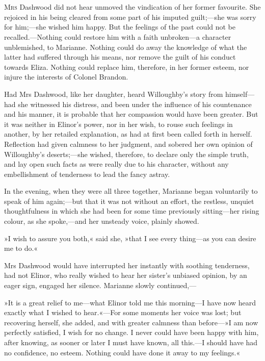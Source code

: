 \chapter[Chapter \thechapter]{}
\lettrine[lines=4,lraise=0.3]{M}{rs} Dashwood did not hear unmoved the vindication of her former favourite. She rejoiced in his being cleared from some part of his imputed guilt;—she was sorry for him;—she wished him happy. But the feelings of the past could not be recalled.—Nothing could restore him with a faith unbroken—a character unblemished, to Marianne. Nothing could do away the knowledge of what the latter had suffered through his means, nor remove the guilt of his conduct towards Eliza. Nothing could replace him, therefore, in her former esteem, nor injure the interests of Colonel Brandon.

Had Mrs Dashwood, like her daughter, heard Willoughby’s story from himself—had she witnessed his distress, and been under the influence of his countenance and his manner, it is probable that her compassion would have been greater. But it was neither in Elinor’s power, nor in her wish, to rouse such feelings in another, by her retailed explanation, as had at first been called forth in herself. Reflection had given calmness to her judgment, and sobered her own opinion of Willoughby’s deserts;—she wished, therefore, to declare only the simple truth, and lay open such facts as were really due to his character, without any embellishment of tenderness to lead the fancy astray.

In the evening, when they were all three together, Marianne began voluntarily to speak of him again;—but that it was not without an effort, the restless, unquiet thoughtfulness in which she had been for some time previously sitting—her rising colour, as she spoke,—and her unsteady voice, plainly showed.

»I wish to assure you both,« said she, »that I see every thing—as you can desire me to do.«

Mrs Dashwood would have interrupted her instantly with soothing tenderness, had not Elinor, who really wished to hear her sister’s unbiased opinion, by an eager sign, engaged her silence. Marianne slowly continued,—

»It is a great relief to me—what Elinor told me this morning—I have now heard exactly what I wished to hear.«—For some moments her voice was lost; but recovering herself, she added, and with greater calmness than before—»I am now perfectly satisfied, I wish for no change. I never could have been happy with him, after knowing, as sooner or later I must have known, all this.—I should have had no confidence, no esteem. Nothing could have done it away to my feelings.«

